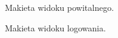 \begin{figure}[H]
    \centering
    \caption{Makieta widoku powitalnego.}
\end{figure}

\begin{figure}[H]
    \centering
    \caption{Makieta widoku logowania.}
\end{figure}

